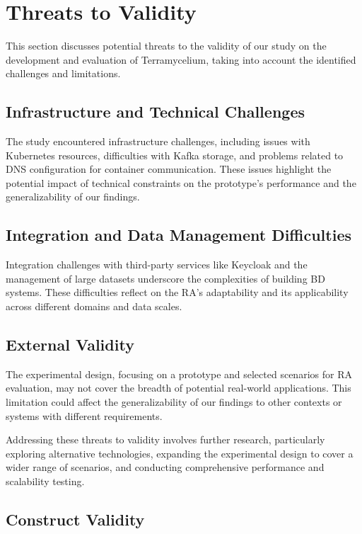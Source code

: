 \documentclass[preprint,12pt]{elsarticle}
\begin{document}
\section{Threats to Validity}

This section discusses potential threats to the validity of our study on the development and evaluation of Terramycelium, taking into account the identified challenges and limitations.

\subsection{Infrastructure and Technical Challenges}
The study encountered infrastructure challenges, including issues with Kubernetes resources, difficulties with Kafka storage, and problems related to DNS configuration for container communication. These issues highlight the potential impact of technical constraints on the prototype's performance and the generalizability of our findings.

\subsection{Integration and Data Management Difficulties}
Integration challenges with third-party services like Keycloak and the management of large datasets underscore the complexities of building BD systems. These difficulties reflect on the RA's adaptability and its applicability across different domains and data scales.

\subsection{External Validity}
The experimental design, focusing on a prototype and selected scenarios for RA evaluation, may not cover the breadth of potential real-world applications. This limitation could affect the generalizability of our findings to other contexts or systems with different requirements.

Addressing these threats to validity involves further research, particularly exploring alternative technologies, expanding the experimental design to cover a wider range of scenarios, and conducting comprehensive performance and scalability testing.

\subsection{Construct Validity}
\end{document}
